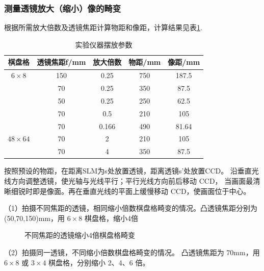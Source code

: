 \documentclass[10pt,a4paper,twoside,UTF8]{ctexart}
\begin{document}
\subsubsection{测量透镜放大（缩小）像的畸变}
根据所需放大倍数及透镜焦距计算物距和像距，计算结果见表\ref{tab:par}.
\begin{table}[H]
	\centering
	  \begin{tabular}{ccccc}
	  \toprule
	  棋盘格 & 透镜焦距f/mm & 放大倍数 & 物距/mm & 像距/mm \\
	  \midrule
	    $6\times 8 $    & 150   & 0.25  & 750   & 187.5 \\
	       & 70    & 0.25  & 350   & 87.5 \\
	       & 50    & 0.25  & 250   & 62.5 \\
	       & 70    & 0.5   & 210   & 105 \\
	       & 70    & 0.166 & 490   & 81.64 \\
		\midrule
		$48\times 64 $    & 70    & 2     & 210   & 105 \\
	       & 70    & 4     & 350   & 87.5 \\
	  \bottomrule
	  \end{tabular}
	\caption{实验仪器摆放参数}
	\label{tab:par}
  \end{table}


  按照预设的物距，在距离SLM为s处放置透镜，距离透镜s'处放置CCD。
  沿垂直光线方向调整透镜，使光轴与光线平行；平行光线方向前后移动 CCD，
  当画面最清晰细锐时即是像面。再在垂直光线的平面上缓慢移动 CCD，使画面位于中心。

（1）拍摄不同焦距的透镜，相同缩小倍数棋盘格畸变的情况。凸透镜焦距分别为(50,70,150)mm，用 $6\times 8$ 棋盘格，缩小4倍
\begin{figure}[H]
	\centering
	\caption{不同焦距的透镜缩小4倍棋盘格畸变}
	\label{fig:dif_f}
\end{figure}

（2）拍摄同一透镜，不同缩小倍数棋盘格畸变的情况。
凸透镜焦距为 70mm，用 $6\times 8$ 或 $3\times 4$ 棋盘格，分别缩小 2、4、6 倍。
\end{document}
